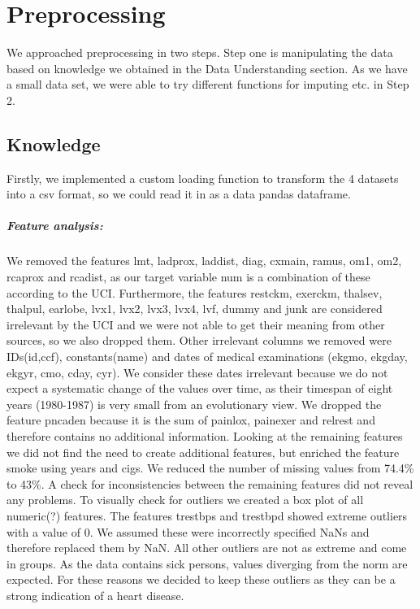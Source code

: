 \chapter{Preprocessing}
We approached preprocessing in two steps. Step one is manipulating the data based on knowledge we obtained in the Data Understanding section. 
As we have a small data set, we were able to try different functions for imputing etc. in Step 2.


\section{Knowledge}
Firstly, we implemented a custom loading function to transform the 4 datasets into a csv format, so we could read it in as a data pandas dataframe.

\paragraph{Feature analysis:}
We removed the features lmt, ladprox, laddist, diag, cxmain, ramus, om1, om2, rcaprox and rcadist, as our target variable num is a combination of these according to the UCI. Furthermore, the features restckm, exerckm, thalsev, thalpul, earlobe, lvx1, lvx2, lvx3, lvx4, lvf, dummy and junk are considered irrelevant by the UCI and we were not able to get their meaning from other sources, so we also dropped them. Other irrelevant columns we removed were IDs(id,ccf), constants(name) and dates of medical examinations (ekgmo, ekgday, ekgyr, cmo, cday, cyr). We consider these dates irrelevant because we do not expect a systematic change of the values over time, as their timespan of eight years (1980-1987) is very small from an evolutionary view. We dropped the feature pncaden because it is the sum of painlox, painexer and relrest and therefore contains no additional information. Looking at the remaining features we did not find the need to create additional features, but enriched the feature smoke using years and cigs. We reduced the number of missing values from 74.4\% to 43\%. A check for inconsistencies between the remaining features did not reveal any problems.
To visually check for outliers we created a box plot of all numeric(?) features. The features trestbps and trestbpd showed extreme outliers with a value of 0. We assumed these were incorrectly specified NaNs and therefore replaced them by NaN. All other outliers are not as extreme and come in groups. As the data contains sick persons, values diverging from the norm are expected. For these reasons we decided to keep these outliers as they can be a strong indication of a heart disease.
